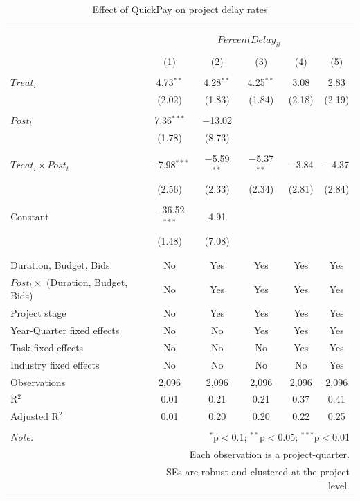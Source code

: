 \documentclass[
]{article}
\begin{document}
\begin{table}[H] \centering 
  \caption{Effect of QuickPay on project delay rates} 
  \label{} 
\small 
\begin{tabular}{@{\extracolsep{-2pt}}lccccc} 
\\[-1.8ex]\hline 
\hline \\[-1.8ex] 
\\[-1.8ex] & \multicolumn{5}{c}{$PercentDelay_{it}$} \\ 
\\[-1.8ex] & (1) & (2) & (3) & (4) & (5)\\ 
\hline \\[-1.8ex] 
 $Treat_i$ & 4.73$^{**}$ & 4.28$^{**}$ & 4.25$^{**}$ & 3.08 & 2.83 \\ 
  & (2.02) & (1.83) & (1.84) & (2.18) & (2.19) \\ 
  & & & & & \\ 
 $Post_t$ & 7.36$^{***}$ & $-$13.02 &  &  &  \\ 
  & (1.78) & (8.73) &  &  &  \\ 
  & & & & & \\ 
 $Treat_i \times Post_t$ & $-$7.98$^{***}$ & $-$5.59$^{**}$ & $-$5.37$^{**}$ & $-$3.84 & $-$4.37 \\ 
  & (2.56) & (2.33) & (2.34) & (2.81) & (2.84) \\ 
  & & & & & \\ 
 Constant & $-$36.52$^{***}$ & 4.91 &  &  &  \\ 
  & (1.48) & (7.08) &  &  &  \\ 
  & & & & & \\ 
\hline \\[-1.8ex] 
Duration, Budget, Bids & No & Yes & Yes & Yes & Yes \\ 
$Post_t \times$  (Duration, Budget, Bids) & No & Yes & Yes & Yes & Yes \\ 
Project stage & No & Yes & Yes & Yes & Yes \\ 
Year-Quarter fixed effects & No & No & Yes & Yes & Yes \\ 
Task fixed effects & No & No & No & Yes & Yes \\ 
Industry fixed effects & No & No & No & No & Yes \\ 
Observations & 2,096 & 2,096 & 2,096 & 2,096 & 2,096 \\ 
R$^{2}$ & 0.01 & 0.21 & 0.21 & 0.37 & 0.41 \\ 
Adjusted R$^{2}$ & 0.01 & 0.20 & 0.20 & 0.22 & 0.25 \\ 
\hline 
\hline \\[-1.8ex] 
\textit{Note:}  & \multicolumn{5}{r}{$^{*}$p$<$0.1; $^{**}$p$<$0.05; $^{***}$p$<$0.01} \\ 
 & \multicolumn{5}{r}{Each observation is a project-quarter.} \\ 
 & \multicolumn{5}{r}{SEs are robust and clustered at the project level.} \\ 
\end{tabular} 
\end{table}
\end{document}
